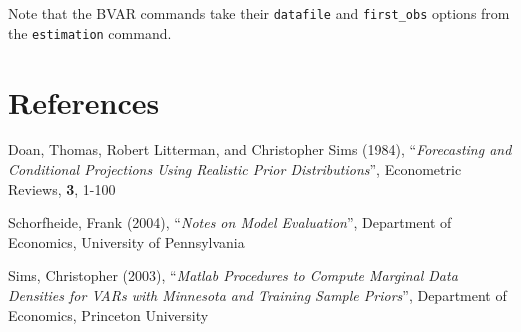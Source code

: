 \documentclass[11pt,a4paper]{article}
\begin{document}
Note that the BVAR commands take their \texttt{datafile} and \texttt{first\_obs} options from the \texttt{estimation} command.



\section*{References}

\noindent Doan, Thomas, Robert Litterman, and Christopher Sims (1984), ``\textit{Forecasting and Conditional Projections Using Realistic Prior Distributions}'', Econometric Reviews, \textbf{3}, 1-100

Schorfheide, Frank (2004), ``\textit{Notes on Model Evaluation}'', Department of Economics, University of Pennsylvania

Sims, Christopher (2003), ``\textit{Matlab Procedures to Compute Marginal Data Densities for VARs with Minnesota and Training Sample Priors}'', Department of Economics, Princeton University
\end{document}
